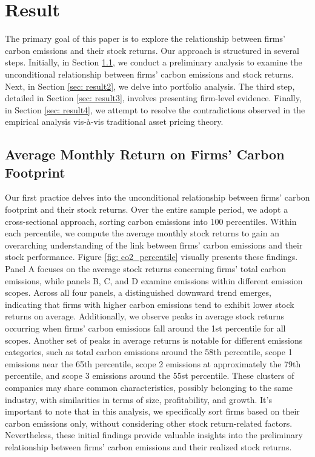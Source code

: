 \documentclass[12pt]{article}
\begin{document}
\section{Result} \label{sec: result}

The primary goal of this paper is to explore the relationship between firms' carbon emissions and their stock returns. Our approach is structured in several steps. Initially, in Section \ref{sec: result1}, we conduct a preliminary analysis to examine the unconditional relationship between firms' carbon emissions and stock returns. Next, in Section \ref{sec: result2}, we delve into portfolio analysis. The third step, detailed in Section \ref{sec: result3}, involves presenting firm-level evidence. Finally, in Section \ref{sec: result4}, we attempt to resolve the contradictions observed in the empirical analysis vis-à-vis traditional asset pricing theory.
\subsection{Average Monthly Return on Firms' Carbon Footprint}
\label{sec: result1}
Our first practice delves into the unconditional relationship between firms' carbon footprint and their stock returns. Over the entire sample period, we adopt a cross-sectional approach, sorting carbon emissions into 100 percentiles. Within each percentile, we compute the average monthly stock returns to gain an overarching understanding of the link between firms' carbon emissions and their stock performance. Figure \ref{fig: co2_percentile} visually presents these findings. Panel A focuses on the average stock returns concerning firms' total carbon emissions, while panels B, C, and D examine emissions within different emission scopes. Across all four panels, a distinguished downward trend emerges, indicating that firms with higher carbon emissions tend to exhibit lower stock returns on average. Additionally, we observe peaks in average stock returns occurring when firms' carbon emissions fall around the 1st percentile for all scopes. Another set of peaks in average returns is notable for different emissions categories, such as total carbon emissions around the 58th percentile, scope 1 emissions near the 65th percentile, scope 2 emissions at approximately the 79th percentile, and scope 3 emissions around the 55st percentile. These clusters of companies may share common characteristics, possibly belonging to the same industry, with similarities in terms of size, profitability, and growth. It's important to note that in this analysis, we specifically sort firms based on their carbon emissions only, without considering other stock return-related factors. Nevertheless, these initial findings provide valuable insights into the preliminary relationship between firms' carbon emissions and their realized stock returns.
\end{document}
